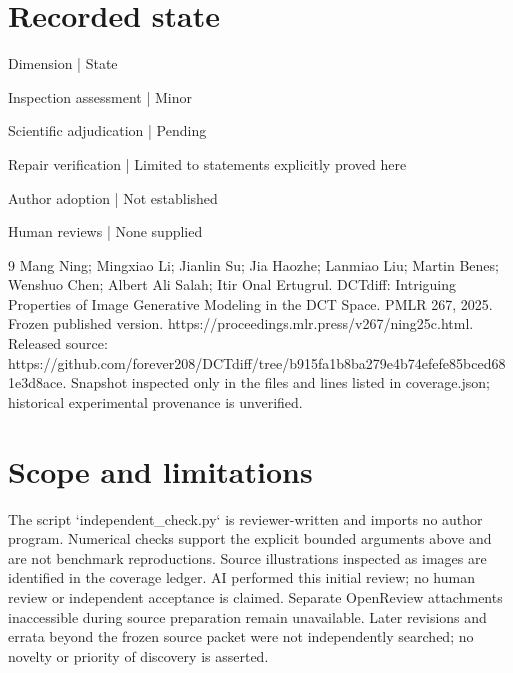 \documentclass[10pt]{article}
\begin{document}
\section*{Recorded state}
Dimension | State\par
Inspection assessment | Minor\par
Scientific adjudication | Pending\par
Repair verification | Limited to statements explicitly proved here\par
Author adoption | Not established\par
Human reviews | None supplied\par
9 Mang Ning; Mingxiao Li; Jianlin Su; Jia Haozhe; Lanmiao Liu; Martin Benes; Wenshuo Chen; Albert Ali Salah; Itir Onal Ertugrul. DCTdiff: Intriguing Properties of Image Generative Modeling in the DCT Space. PMLR 267, 2025. Frozen published version. https://proceedings.mlr.press/v267/ning25c.html. Released source: https://github.com/forever208/DCTdiff/tree/b915fa1b8ba279e4b74efefe85bced681e3d8ace. Snapshot inspected only in the files and lines listed in coverage.json; historical experimental provenance is unverified.\par
\section*{Scope and limitations}
The script `independent\_check.py` is reviewer-written and imports no author program. Numerical checks support the explicit bounded arguments above and are not benchmark reproductions. Source illustrations inspected as images are identified in the coverage ledger. AI performed this initial review; no human review or independent acceptance is claimed. Separate OpenReview attachments inaccessible during source preparation remain unavailable. Later revisions and errata beyond the frozen source packet were not independently searched; no novelty or priority of discovery is asserted.\par
\end{document}
